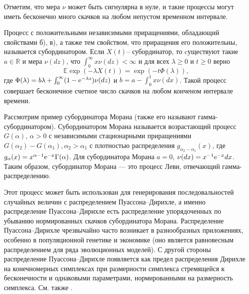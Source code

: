 \begin{remark}
Отметим, что мера $\nu$ может быть сигнулярна  в нуле, и такие процессы могут иметь бесконечно много  скачков на любом непустом временном интервале.

Процесс с положительными независимыми приращениями, обладающий свойствами б), в), а также тем свойством, что приращения его положительны, называется субординатором. Если $X(t)$-- субординатор, то cуществуют такие $a\in\mathbb{R}$ и мера $\nu(dz)$, что $\int_{0}^{\infty}x\nu(dz)<\infty$ и для всех $\lambda\geq 0$ и $t\geq0$ верно
 $$\mathbb{E}\exp{(-\lambda X(t))} = \exp\left(-t\Phi(\lambda)\right),$$ 
 где $\Phi(\lambda) = b\lambda+\int_{0}^{\infty}(1-{\rm e}^{-\lambda z}) \nu(dz)$ и 
 $b = a-\int_{0}^{1} x\nu(dx)$.
 Такой процесс совершает бесконечное счетное  число скачков на любом конченом интервале времени.  
 
 Рассмотрим пример субординатора Морана (также его называют гамма-субординатором). Субординатором Морана называется возрастающий процесс $G(\alpha),\, \alpha>0$ с независимыми стационарными приращениями $G(\alpha_2)-G(\alpha_1), \alpha_2>\alpha_1$ с плотностью распределения  $g_{\alpha_2-\alpha_1}(x)$, где $g_{\alpha}(x)= x^{\alpha-1} {\rm e}^{-x}\Gamma(\alpha)$.
Для субординатора Морана $a=0$, $\nu(dx) = x^{-1}{\rm e}^{-x}dx$. 
Таким образом, субординатор Морана --- это процесс Леви, отвечающий гамма-распределению.

Этот процесс может быть использован для генерирования последовальностей случайных величин с распределением Пуассона--Дирихле, а именно распределение Пуассона--Дирихле есть распределение упорядоченных по убыванию нормированных скачков субординатора Морана. Распределение Пуассона--Дирихле чрезвычайно часто возникает в разнообразных приложениях, особенно в популяционной генетике и экономике (оно является равновесным распределением для ряда эволюционных моделей). С другой стороны распределение Пуассона--Дирихле появляется как предел распределения Дирихле на конечномерных симплексах при размерности симплекса стремящейся к бесконечности и однаковыми параметрами, нормированными на размерность симплекса. См. также \cite{202}.
\end{remark}

